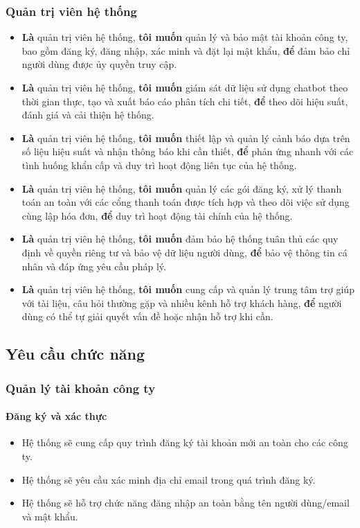 \subsubsection{Quản trị viên hệ thống}
\begin{itemize}
    \item \textbf{Là} quản trị viên hệ thống, \textbf{tôi muốn} quản lý và bảo mật tài khoản công ty, bao gồm đăng ký, đăng nhập, xác minh và đặt lại mật khẩu, \textbf{để} đảm bảo chỉ người dùng được ủy quyền truy cập.
    \item \textbf{Là} quản trị viên hệ thống, \textbf{tôi muốn} giám sát dữ liệu sử dụng chatbot theo thời gian thực, tạo và xuất báo cáo phân tích chi tiết, \textbf{để} theo dõi hiệu suất, đánh giá và cải thiện hệ thống.
    \item \textbf{Là} quản trị viên hệ thống, \textbf{tôi muốn} thiết lập và quản lý cảnh báo dựa trên số liệu hiệu suất và nhận thông báo khi cần thiết, \textbf{để} phản ứng nhanh với các tình huống khẩn cấp và duy trì hoạt động liên tục của hệ thống.
    \item \textbf{Là} quản trị viên hệ thống, \textbf{tôi muốn} quản lý các gói đăng ký, xử lý thanh toán an toàn với các cổng thanh toán được tích hợp và theo dõi việc sử dụng cùng lập hóa đơn, \textbf{để} duy trì hoạt động tài chính của hệ thống.
    \item \textbf{Là} quản trị viên hệ thống, \textbf{tôi muốn} đảm bảo hệ thống tuân thủ các quy định về quyền riêng tư và bảo vệ dữ liệu người dùng, \textbf{để} bảo vệ thông tin cá nhân và đáp ứng yêu cầu pháp lý.
    \item \textbf{Là} quản trị viên hệ thống, \textbf{tôi muốn} cung cấp và quản lý trung tâm trợ giúp với tài liệu, câu hỏi thường gặp và nhiều kênh hỗ trợ khách hàng, \textbf{để} người dùng có thể tự giải quyết vấn đề hoặc nhận hỗ trợ khi cần.
\end{itemize}

\subsection{Yêu cầu chức năng}

\subsubsection{Quản lý tài khoản công ty}

\paragraph{Đăng ký và xác thực}
\begin{itemize}
    \item Hệ thống sẽ cung cấp quy trình đăng ký tài khoản mới an toàn cho các công ty.
    \item Hệ thống sẽ yêu cầu xác minh địa chỉ email trong quá trình đăng ký.
    \item Hệ thống sẽ hỗ trợ chức năng đăng nhập an toàn bằng tên người dùng/email và mật khẩu.
\end{itemize}

